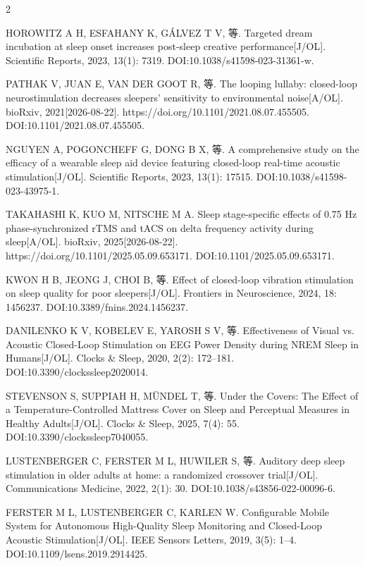 \documentclass[UTF8,zihao=5,fontset=none]{ctexart}
\begin{document}
\begin{multicols}{2}
{\makebox[25.2pt][l]{[94]}HOROWITZ A H, ESFAHANY K, GÁLVEZ T V, 等. Targeted dream incubation at sleep onset increases post-sleep creative performance[J/OL]. Scientific Reports, 2023, 13(1): 7319. DOI:10.1038/s41598-023-31361-w.\par
\makebox[25.2pt][l]{[95]}PATHAK V, JUAN E, VAN DER GOOT R, 等. The looping lullaby: closed-loop neurostimulation decreases sleepers’ sensitivity to environmental noise[A/OL]. bioRxiv, 2021[2026-08-22]. https://doi.org/10.1101/2021.08.07.455505. DOI:10.1101/2021.08.07.455505.\par
\makebox[25.2pt][l]{[96]}NGUYEN A, POGONCHEFF G, DONG B X, 等. A comprehensive study on the efficacy of a wearable sleep aid device featuring closed-loop real-time acoustic stimulation[J/OL]. Scientific Reports, 2023, 13(1): 17515. DOI:10.1038/s41598-023-43975-1.\par
\makebox[25.2pt][l]{[97]}TAKAHASHI K, KUO M, NITSCHE M A. Sleep stage-specific effects of 0.75 Hz phase-synchronized rTMS and tACS on delta frequency activity during sleep[A/OL]. bioRxiv, 2025[2026-08-22]. https://doi.org/10.1101/2025.05.09.653171. DOI:10.1101/2025.05.09.653171.\par
\makebox[25.2pt][l]{[98]}KWON H B, JEONG J, CHOI B, 等. Effect of closed-loop vibration stimulation on sleep quality for poor sleepers[J/OL]. Frontiers in Neuroscience, 2024, 18: 1456237. DOI:10.3389/fnins.2024.1456237.\par
\makebox[25.2pt][l]{[99]}DANILENKO K V, KOBELEV E, YAROSH S V, 等. Effectiveness of Visual vs. Acoustic Closed-Loop Stimulation on EEG Power Density during NREM Sleep in Humans[J/OL]. Clocks \& Sleep, 2020, 2(2): 172--181. DOI:10.3390/clockssleep2020014.\par
\makebox[25.2pt][l]{[100]}STEVENSON S, SUPPIAH H, MÜNDEL T, 等. Under the Covers: The Effect of a Temperature-Controlled Mattress Cover on Sleep and Perceptual Measures in Healthy Adults[J/OL]. Clocks \& Sleep, 2025, 7(4): 55. DOI:10.3390/clockssleep7040055.\par
\makebox[25.2pt][l]{[101]}LUSTENBERGER C, FERSTER M L, HUWILER S, 等. Auditory deep sleep stimulation in older adults at home: a randomized crossover trial[J/OL]. Communications Medicine, 2022, 2(1): 30. DOI:10.1038/s43856-022-00096-6.\par
\makebox[25.2pt][l]{[102]}FERSTER M L, LUSTENBERGER C, KARLEN W. Configurable Mobile System for Autonomous High-Quality Sleep Monitoring and Closed-Loop Acoustic Stimulation[J/OL]. IEEE Sensors Letters, 2019, 3(5): 1--4. DOI:10.1109/lsens.2019.2914425.\par
}
\end{multicols}
\end{document}
